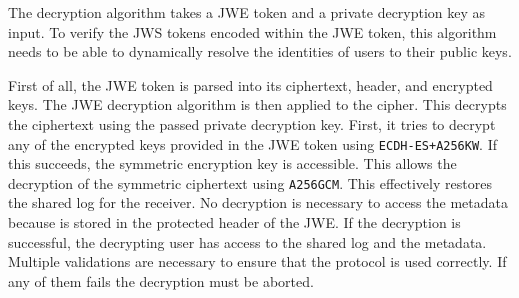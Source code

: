 \documentclass[../main.tex]{subfiles}
\begin{document}
The decryption algorithm takes a JWE token and a private decryption key as input.
To verify the JWS tokens encoded within the JWE token, this algorithm needs to be able to dynamically resolve the identities of users to their public keys.

First of all, the JWE token is parsed into its ciphertext, header, and encrypted keys.
The JWE decryption algorithm is then applied to the cipher.
This decrypts the ciphertext using the passed private decryption key.
First, it tries to decrypt any of the encrypted keys provided in the JWE token using \verb|ECDH-ES+A256KW|.
If this succeeds, the symmetric encryption key is accessible.
This allows the decryption of the symmetric ciphertext using \verb|A256GCM|.
This effectively restores the shared log for the receiver.
No decryption is necessary to access the metadata because is stored in the protected header of the JWE.
If the decryption is successful, the decrypting user has access to the shared log and the metadata.
Multiple validations are necessary to ensure that the protocol is used correctly.
If any of them fails the decryption must be aborted.
\end{document}
